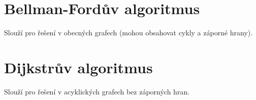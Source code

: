 
\section{Bellman-Fordův algoritmus}

Slouží pro řešení v obecných grafech (mohou obsahovat cykly a záporné hrany).


\section{Dijkstrův algoritmus}

Slouží pro řešení v acyklických grafech bez záporných hran.
